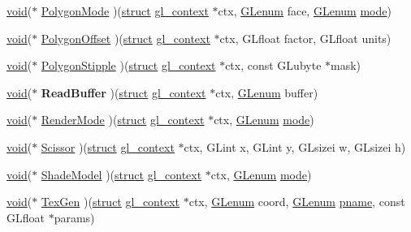 \begin{Indent}
\begin{DoxyCompactItemize}
\item 
\hyperlink{interfacevoid}{void}($\ast$ \hyperlink{structdd__function__table_a10d886b8170e9960a05c351ec600d89a}{Polygon\+Mode} )(\hyperlink{interfacestruct}{struct} \hyperlink{structgl__context}{gl\+\_\+context} $\ast$ctx, \hyperlink{interfacevoid}{G\+Lenum} face, \hyperlink{interfacevoid}{G\+Lenum} \hyperlink{interfacevoid}{mode})
\item 
\hyperlink{interfacevoid}{void}($\ast$ \hyperlink{structdd__function__table_a9b6a80c3d27fbca5dbec612643772239}{Polygon\+Offset} )(\hyperlink{interfacestruct}{struct} \hyperlink{structgl__context}{gl\+\_\+context} $\ast$ctx, G\+Lfloat factor, G\+Lfloat units)
\item 
\hyperlink{interfacevoid}{void}($\ast$ \hyperlink{structdd__function__table_a5928f5d5a53c3faadbbd666c6d1fd7c2}{Polygon\+Stipple} )(\hyperlink{interfacestruct}{struct} \hyperlink{structgl__context}{gl\+\_\+context} $\ast$ctx, const G\+Lubyte $\ast$mask)
\item 
\mbox{\label{structdd__function__table_a1e2d386ebff16ec051de38432a63cd21}} 
\hyperlink{interfacevoid}{void}($\ast$ {\bfseries Read\+Buffer} )(\hyperlink{interfacestruct}{struct} \hyperlink{structgl__context}{gl\+\_\+context} $\ast$ctx, \hyperlink{interfacevoid}{G\+Lenum} buffer)
\item 
\hyperlink{interfacevoid}{void}($\ast$ \hyperlink{structdd__function__table_aeab038e3944ccf13ec3d4867bd3ff5eb}{Render\+Mode} )(\hyperlink{interfacestruct}{struct} \hyperlink{structgl__context}{gl\+\_\+context} $\ast$ctx, \hyperlink{interfacevoid}{G\+Lenum} \hyperlink{interfacevoid}{mode})
\item 
\hyperlink{interfacevoid}{void}($\ast$ \hyperlink{structdd__function__table_a73e64b5bab55c1588ff9b58f21249f60}{Scissor} )(\hyperlink{interfacestruct}{struct} \hyperlink{structgl__context}{gl\+\_\+context} $\ast$ctx, G\+Lint x, G\+Lint y, G\+Lsizei w, G\+Lsizei h)
\item 
\hyperlink{interfacevoid}{void}($\ast$ \hyperlink{structdd__function__table_a516726131e38d6075ce43582d23eb2b5}{Shade\+Model} )(\hyperlink{interfacestruct}{struct} \hyperlink{structgl__context}{gl\+\_\+context} $\ast$ctx, \hyperlink{interfacevoid}{G\+Lenum} \hyperlink{interfacevoid}{mode})
\item 
\hyperlink{interfacevoid}{void}($\ast$ \hyperlink{structdd__function__table_a89a6ee25a5d54cd2461ade62048f4051}{Tex\+Gen} )(\hyperlink{interfacestruct}{struct} \hyperlink{structgl__context}{gl\+\_\+context} $\ast$ctx, \hyperlink{interfacevoid}{G\+Lenum} coord, \hyperlink{interfacevoid}{G\+Lenum} \hyperlink{interfacevoid}{pname}, const G\+Lfloat $\ast$params)

\end{DoxyCompactItemize}
\end{Indent}
